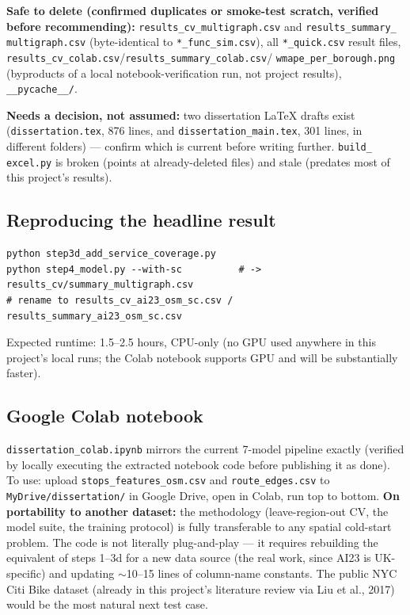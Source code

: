 \documentclass[11pt]{article}
\let\oldsubsection\subsection
\renewcommand{\subsection}[1]{\oldsubsection{\color{sectcolor}#1}}
\begin{document}
\textbf{Safe to delete (confirmed duplicates or smoke-test scratch, verified before
recommending):} \texttt{results\_cv\_multigraph.csv} and \texttt{results\_summary\_
multigraph.csv} (byte-identical to \texttt{*\_func\_sim.csv}), all \texttt{*\_quick.csv}
result files, \texttt{results\_cv\_colab.csv}/\texttt{results\_summary\_colab.csv}/
\texttt{wmape\_per\_borough.png} (byproducts of a local notebook-verification run, not
project results), \texttt{\_\_pycache\_\_/}.

\textbf{Needs a decision, not assumed:} two dissertation LaTeX drafts exist
(\texttt{dissertation.tex}, 876 lines, and \texttt{dissertation\_main.tex}, 301 lines, in
different folders) --- confirm which is current before writing further. \texttt{build\_
excel.py} is broken (points at already-deleted files) and stale (predates most of this
project's results).

\subsection{Reproducing the headline result}
{\small\begin{verbatim}
python step3d_add_service_coverage.py
python step4_model.py --with-sc          # -> results_cv/summary_multigraph.csv
# rename to results_cv_ai23_osm_sc.csv / results_summary_ai23_osm_sc.csv
\end{verbatim}}
Expected runtime: 1.5--2.5 hours, CPU-only (no GPU used anywhere in this project's local
runs; the Colab notebook supports GPU and will be substantially faster).

\subsection{Google Colab notebook}
\texttt{dissertation\_colab.ipynb} mirrors the current 7-model pipeline exactly (verified by
locally executing the extracted notebook code before publishing it as done). To use: upload
\texttt{stops\_features\_osm.csv} and \texttt{route\_edges.csv} to
\texttt{MyDrive/dissertation/} in Google Drive, open in Colab, run top to bottom.
\textbf{On portability to another dataset:} the methodology (leave-region-out CV, the model
suite, the training protocol) is fully transferable to any spatial cold-start problem. The
code is not literally plug-and-play --- it requires rebuilding the equivalent of steps 1--3d
for a new data source (the real work, since AI23 is UK-specific) and updating $\sim$10--15
lines of column-name constants. The public NYC Citi Bike dataset (already in this project's
literature review via Liu et al., 2017) would be the most natural next test case.
\end{document}
